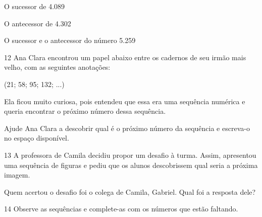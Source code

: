\begin{escolha}
\item O sucessor de 4.089 \reduline{4.090\hfill}

\item O antecessor de 4.302 \reduline{4.301\hfill}

\item O sucessor e o antecessor do número 5.259 
\end{escolha}


\num{12} Ana Clara encontrou um papel abaixo entre os cadernos de seu irmão mais velho, com as seguintes anotações:

(21; 58; 95; 132; ...)

Ela ficou muito curiosa, pois entendeu que essa era uma sequência
numérica e queria encontrar o próximo número dessa sequência.

Ajude Ana Clara a descobrir qual é o próximo número da sequência e escreva-o no espaço disponível.


\num{13} A professora de Camila decidiu propor um desafio à turma. Assim, apresentou uma sequência de figuras e pediu que os alunos descobrissem qual seria a próxima imagem. 


Quem acertou o desafio foi o colega de Camila, Gabriel. Qual foi a resposta dele?




\num{14} Observe as sequências e complete-as com os números que estão faltando.

